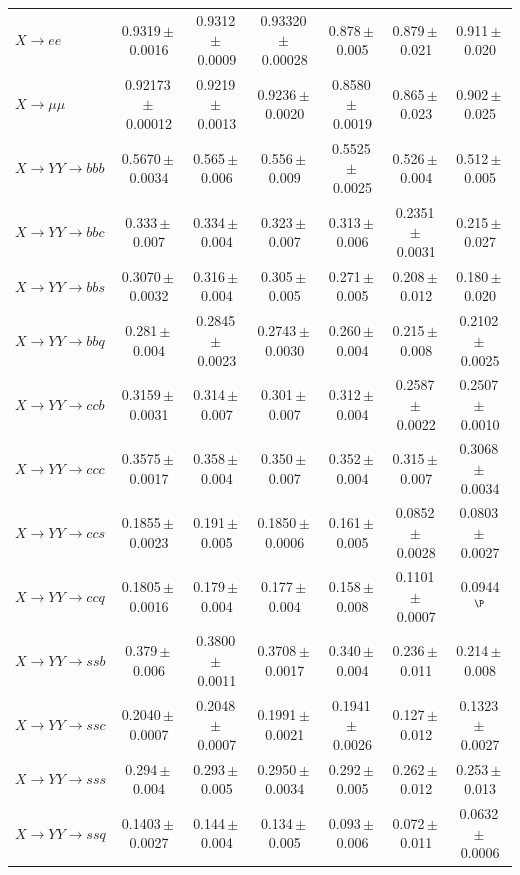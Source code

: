 \documentclass[12pt]{article}   %
\begin{document}
\begin{landscape}
{\begin{longtable}{@{\extracolsep{\fill}}lcccccc@{}}
\midrule
$X\to ee$ & 0.9319\,$\pm$\,0.0016 & 0.9312\,$\pm$\,0.0009 & 0.93320\,$\pm$\,0.00028 & 0.878\,$\pm$\,0.005 & 0.879\,$\pm$\,0.021 & 0.911\,$\pm$\,0.020 \\
$X\to \mu\mu$ & 0.92173\,$\pm$\,0.00012 & 0.9219\,$\pm$\,0.0013 & 0.9236\,$\pm$\,0.0020 & 0.8580\,$\pm$\,0.0019 & 0.865\,$\pm$\,0.023 & 0.902\,$\pm$\,0.025 \\
\midrule
$X\to YY\to bbb$ & 0.5670\,$\pm$\,0.0034 & 0.565\,$\pm$\,0.006 & 0.556\,$\pm$\,0.009 & 0.5525\,$\pm$\,0.0025 & 0.526\,$\pm$\,0.004 & 0.512\,$\pm$\,0.005 \\
$X\to YY\to bbc$ & 0.333\,$\pm$\,0.007 & 0.334\,$\pm$\,0.004 & 0.323\,$\pm$\,0.007 & 0.313\,$\pm$\,0.006 & 0.2351\,$\pm$\,0.0031 & 0.215\,$\pm$\,0.027 \\
$X\to YY\to bbs$ & 0.3070\,$\pm$\,0.0032 & 0.316\,$\pm$\,0.004 & 0.305\,$\pm$\,0.005 & 0.271\,$\pm$\,0.005 & 0.208\,$\pm$\,0.012 & 0.180\,$\pm$\,0.020 \\
$X\to YY\to bbq$ & 0.281\,$\pm$\,0.004 & 0.2845\,$\pm$\,0.0023 & 0.2743\,$\pm$\,0.0030 & 0.260\,$\pm$\,0.004 & 0.215\,$\pm$\,0.008 & 0.2102\,$\pm$\,0.0025 \\
$X\to YY\to ccb$ & 0.3159\,$\pm$\,0.0031 & 0.314\,$\pm$\,0.007 & 0.301\,$\pm$\,0.007 & 0.312\,$\pm$\,0.004 & 0.2587\,$\pm$\,0.0022 & 0.2507\,$\pm$\,0.0010 \\
$X\to YY\to ccc$ & 0.3575\,$\pm$\,0.0017 & 0.358\,$\pm$\,0.004 & 0.350\,$\pm$\,0.007 & 0.352\,$\pm$\,0.004 & 0.315\,$\pm$\,0.007 & 0.3068\,$\pm$\,0.0034 \\
$X\to YY\to ccs$ & 0.1855\,$\pm$\,0.0023 & 0.191\,$\pm$\,0.005 & 0.1850\,$\pm$\,0.0006 & 0.161\,$\pm$\,0.005 & 0.0852\,$\pm$\,0.0028 & 0.0803\,$\pm$\,0.0027 \\
$X\to YY\to ccq$ & 0.1805\,$\pm$\,0.0016 & 0.179\,$\pm$\,0.004 & 0.177\,$\pm$\,0.004 & 0.158\,$\pm$\,0.008 & 0.1101\,$\pm$\,0.0007 & 0.0944$^{\P}$ \\
$X\to YY\to ssb$ & 0.379\,$\pm$\,0.006 & 0.3800\,$\pm$\,0.0011 & 0.3708\,$\pm$\,0.0017 & 0.340\,$\pm$\,0.004 & 0.236\,$\pm$\,0.011 & 0.214\,$\pm$\,0.008 \\
$X\to YY\to ssc$ & 0.2040\,$\pm$\,0.0007 & 0.2048\,$\pm$\,0.0007 & 0.1991\,$\pm$\,0.0021 & 0.1941\,$\pm$\,0.0026 & 0.127\,$\pm$\,0.012 & 0.1323\,$\pm$\,0.0027 \\
$X\to YY\to sss$ & 0.294\,$\pm$\,0.004 & 0.293\,$\pm$\,0.005 & 0.2950\,$\pm$\,0.0034 & 0.292\,$\pm$\,0.005 & 0.262\,$\pm$\,0.012 & 0.253\,$\pm$\,0.013 \\
$X\to YY\to ssq$ & 0.1403\,$\pm$\,0.0027 & 0.144\,$\pm$\,0.004 & 0.134\,$\pm$\,0.005 & 0.093\,$\pm$\,0.006 & 0.072\,$\pm$\,0.011 & 0.0632\,$\pm$\,0.0006 \\

\end{longtable}}
\end{landscape}
\end{document}

